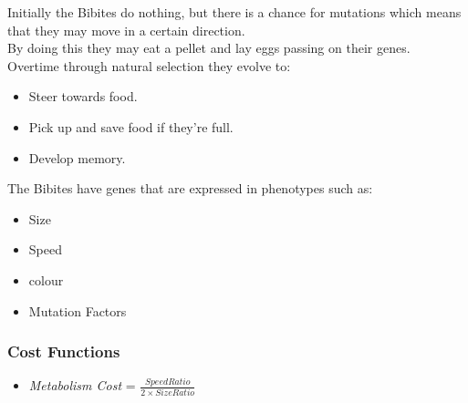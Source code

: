 \documentclass{article}
\begin{document}
Initially the Bibites do nothing, but there is a chance for mutations which means that they may move in a certain direction.\\
By doing this they may eat a pellet and lay eggs passing on their genes.\\
Overtime through natural selection they evolve to:
\begin{itemize}
\item Steer towards food.
\item Pick up and save food if they're full.
\item Develop memory.
\end{itemize}

\newpage
The Bibites have genes that are expressed in phenotypes such as:
\begin{itemize}
    \item Size
    \item Speed
    \item colour
    \item Mutation Factors
\end{itemize}
\subsubsection*{Cost Functions}
\begin{itemize}
    \item \emph{Metabolism Cost} = $\frac{Speed Ratio}{2\times Size Ratio}$
\end{itemize}
\end{document}
